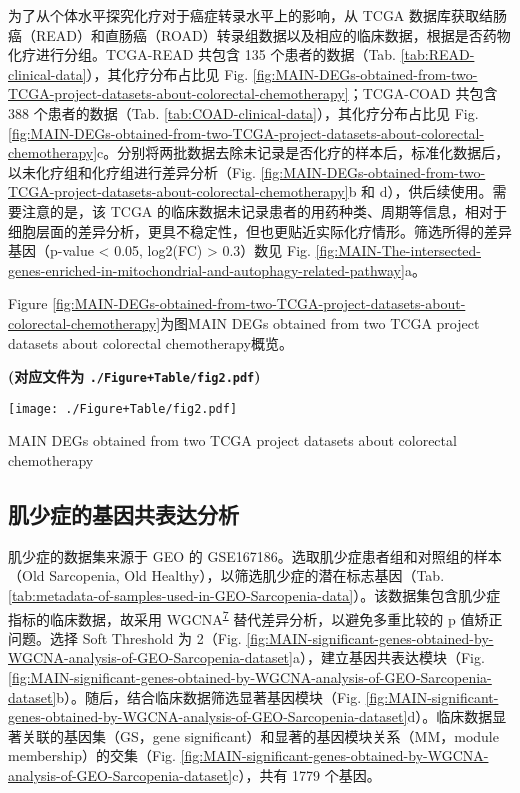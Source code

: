 \documentclass[
]{article}
\begin{document}
为了从个体水平探究化疗对于癌症转录水平上的影响，从 TCGA 数据库获取结肠癌（READ）和直肠癌（ROAD）转录组数据以及相应的临床数据，根据是否药物化疗进行分组。TCGA-READ 共包含 135 个患者的数据（Tab. \ref{tab:READ-clinical-data}），其化疗分布占比见 Fig. \ref{fig:MAIN-DEGs-obtained-from-two-TCGA-project-datasets-about-colorectal-chemotherapy}；TCGA-COAD 共包含 388 个患者的数据（Tab. \ref{tab:COAD-clinical-data}），其化疗分布占比见 Fig. \ref{fig:MAIN-DEGs-obtained-from-two-TCGA-project-datasets-about-colorectal-chemotherapy}c。分别将两批数据去除未记录是否化疗的样本后，标准化数据后，以未化疗组和化疗组进行差异分析（Fig. \ref{fig:MAIN-DEGs-obtained-from-two-TCGA-project-datasets-about-colorectal-chemotherapy}b 和 d），供后续使用。需要注意的是，该 TCGA 的临床数据未记录患者的用药种类、周期等信息，相对于细胞层面的差异分析，更具不稳定性，但也更贴近实际化疗情形。筛选所得的差异基因（p-value \textless{} 0.05, \textbar log2(FC)\textbar{} \textgreater{} 0.3）数见 Fig. \ref{fig:MAIN-The-intersected-genes-enriched-in-mitochondrial-and-autophagy-related-pathway}a。

Figure \ref{fig:MAIN-DEGs-obtained-from-two-TCGA-project-datasets-about-colorectal-chemotherapy}为图MAIN DEGs obtained from two TCGA project datasets about colorectal chemotherapy概览。

\textbf{(对应文件为 \texttt{./Figure+Table/fig2.pdf})}

\def\@captype{figure}
\begin{center}
\texttt{[image: ./Figure+Table/fig2.pdf]}
\caption{MAIN DEGs obtained from two TCGA project datasets about colorectal chemotherapy}\label{fig:MAIN-DEGs-obtained-from-two-TCGA-project-datasets-about-colorectal-chemotherapy}
\end{center}

\hypertarget{SarSig}{%
\subsection{肌少症的基因共表达分析}\label{SarSig}}

肌少症的数据集来源于 GEO 的 GSE167186。选取肌少症患者组和对照组的样本（Old Sarcopenia, Old Healthy），以筛选肌少症的潜在标志基因（Tab. \ref{tab:metadata-of-samples-used-in-GEO-Sarcopenia-data}）。该数据集包含肌少症指标的临床数据，故采用 WGCNA\textsuperscript{\protect\hyperlink{ref-WgcnaAnRPacLangfe2008}{7}} 替代差异分析，以避免多重比较的 p 值矫正问题。选择 Soft Threshold 为 2（Fig. \ref{fig:MAIN-significant-genes-obtained-by-WGCNA-analysis-of-GEO-Sarcopenia-dataset}a），建立基因共表达模块（Fig. \ref{fig:MAIN-significant-genes-obtained-by-WGCNA-analysis-of-GEO-Sarcopenia-dataset}b）。随后，结合临床数据筛选显著基因模块（Fig. \ref{fig:MAIN-significant-genes-obtained-by-WGCNA-analysis-of-GEO-Sarcopenia-dataset}d）。临床数据显著关联的基因集（GS，gene significant）和显著的基因模块关系（MM，module membership）的交集（Fig. \ref{fig:MAIN-significant-genes-obtained-by-WGCNA-analysis-of-GEO-Sarcopenia-dataset}c），共有 1779 个基因。
\end{document}
